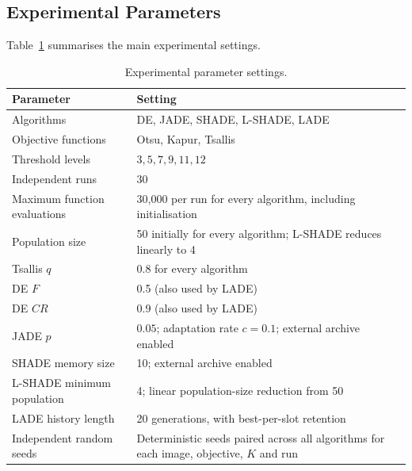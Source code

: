 \documentclass[review,authoryear]{elsarticle}
\begin{document}
\subsection{Experimental Parameters}

Table~\ref{tab:parameters} summarises the main experimental settings.

\begin{table}[H]
\caption{Experimental parameter settings.}
\label{tab:parameters}
\centering

\begin{tabular}{lp{}}
\toprule
\textbf{Parameter} & \textbf{Setting} \\
\midrule

Algorithms &
DE, JADE, SHADE, L-SHADE, LADE \\

Objective functions &
Otsu, Kapur, Tsallis \\

Threshold levels &
$3,5,7,9,11,12$ \\

Independent runs &
30 \\

Maximum function evaluations &
30,000 per run for every algorithm, including initialisation \\

Population size &
50 initially for every algorithm; L-SHADE reduces linearly to 4 \\

Tsallis $q$ &
0.8 for every algorithm \\

DE $F$ &
0.5 (also used by LADE) \\

DE $CR$ &
0.9 (also used by LADE) \\

JADE $p$ &
$0.05$; adaptation rate $c=0.1$; external archive enabled \\

SHADE memory size &
10; external archive enabled \\

L-SHADE minimum population &
4; linear population-size reduction from 50 \\

LADE history length &
20 generations, with best-per-slot retention \\

Independent random seeds &
Deterministic seeds paired across all algorithms for each image, objective, $K$ and run \\

\bottomrule
\end{tabular}

\end{table}
\end{document}
